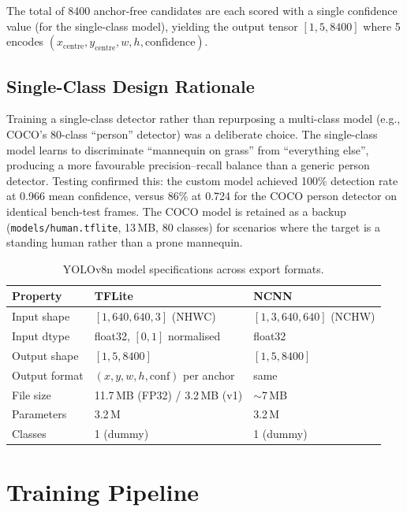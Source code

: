 \documentclass[10pt,a4paper]{article}
\begin{document}
The total of 8400 anchor-free candidates are each scored with a single confidence value (for the single-class model), yielding the output tensor $[1, 5, 8400]$ where 5 encodes $(x_\mathrm{centre}, y_\mathrm{centre}, w, h, \mathrm{confidence})$.

\subsection{Single-Class Design Rationale}

Training a single-class detector rather than repurposing a multi-class model (e.g., COCO's 80-class ``person'' detector) was a deliberate choice. The single-class model learns to discriminate ``mannequin on grass'' from ``everything else'', producing a more favourable precision--recall balance than a generic person detector. Testing confirmed this: the custom model achieved 100\% detection rate at 0.966 mean confidence, versus 86\% at 0.724 for the COCO person detector on identical bench-test frames. The COCO model is retained as a backup (\texttt{models/human.tflite}, 13\,MB, 80 classes) for scenarios where the target is a standing human rather than a prone mannequin.

\begin{table}[ht]
  \centering
  \caption{YOLOv8n model specifications across export formats.}\label{tab:model-specs}
  \begin{tabular}{@{}lll@{}}
    \toprule
    \textbf{Property} & \textbf{TFLite} & \textbf{NCNN} \\
    \midrule
    Input shape       & $[1, 640, 640, 3]$ (NHWC) & $[1, 3, 640, 640]$ (NCHW) \\
    Input dtype       & float32, $[0, 1]$ normalised & float32 \\
    Output shape      & $[1, 5, 8400]$ & $[1, 5, 8400]$ \\
    Output format     & $(x, y, w, h, \mathrm{conf})$ per anchor & same \\
    File size         & 11.7\,MB (FP32) / 3.2\,MB (v1) & ${\sim}$7\,MB \\
    Parameters        & 3.2\,M & 3.2\,M \\
    Classes           & 1 (dummy) & 1 (dummy) \\
    \bottomrule
  \end{tabular}
\end{table}


\section{Training Pipeline}\label{sec:training}
\end{document}
